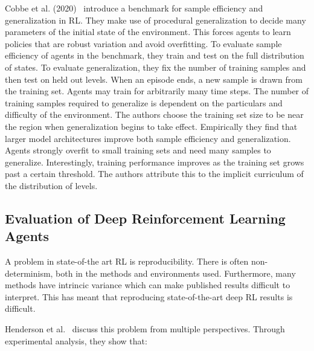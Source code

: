 Cobbe et al. (2020)~\cite{cobbe_procgen_2020} introduce a benchmark for sample efficiency and generalization in RL.
They make use of procedural generalization to decide many parameters of the initial state of the environment.
This forces agents to learn policies that are robust variation and avoid overfitting.
To evaluate sample efficiency of agents in the benchmark, they train and test on the full distribution of states.
To evaluate generalization, they fix the number of training samples and then test on held out levels.
When an episode ends, a new sample is drawn from the training set.
Agents may train for arbitrarily many time steps.
The number of training samples required to generalize is dependent on the particulars and difficulty of the environment.
The authors choose the training set size to be near the region when generalization begins to take effect.
Empirically they find that larger model architectures improve both sample efficiency and generalization.
Agents strongly overfit to small training sets and need many samples to generalize.
Interestingly, training performance improves as the training set grows past a certain threshold.
The authors attribute this to the implicit curriculum of the distribution of levels.

\subsection{Evaluation of Deep Reinforcement Learning Agents}

A problem in state-of-the art RL is reproducibility.
There is often non-determinism, both in the methods and environments used.
Furthermore, many methods have intrincic variance which can make published results difficult to interpret.
This has meant that reproducing state-of-the-art deep RL results is difficult.

Henderson et al.~\cite{henderson_matters_2018} discuss this problem from multiple perspectives.
Through experimental analysis, they show that:

